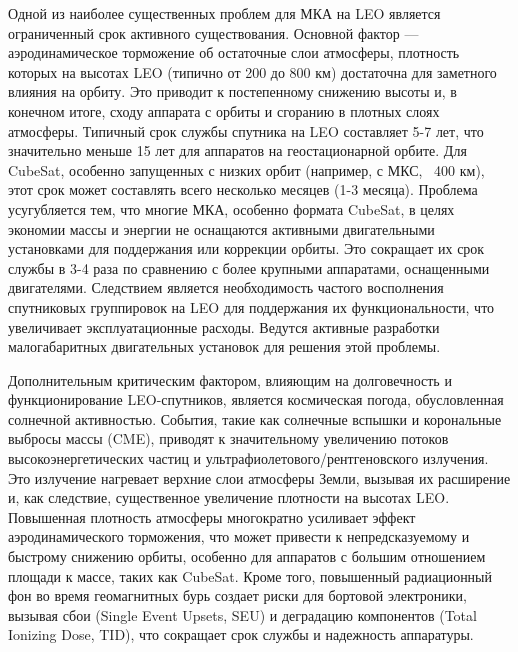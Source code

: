 Одной из наиболее существенных проблем для МКА на LEO является ограниченный срок активного существования. Основной фактор — аэродинамическое торможение об остаточные слои атмосферы, плотность которых на высотах LEO (типично от 200 до 800 км) достаточна для заметного влияния на орбиту\cite{leo_lifespan_smith_2021}. Это приводит к постепенному снижению высоты и, в конечном итоге, сходу аппарата с орбиты и сгоранию в плотных слоях атмосферы. Типичный срок службы спутника на LEO составляет 5-7 лет, что значительно меньше 15 лет для аппаратов на геостационарной орбите\cite{leo_lifespan_smith_2021}. Для CubeSat, особенно запущенных с низких орбит (например, с МКС, ~400 км), этот срок может составлять всего несколько месяцев (1-3 месяца)\cite{cubesat_low_orbit_nasa_2020}. Проблема усугубляется тем, что многие МКА, особенно формата CubeSat, в целях экономии массы и энергии не оснащаются активными двигательными установками для поддержания или коррекции орбиты\cite{cubesat_standard_2014}. Это сокращает их срок службы в 3-4 раза по сравнению с более крупными аппаратами, оснащенными двигателями\cite{cubesat_standard_2014}. Следствием является необходимость частого восполнения спутниковых группировок на LEO для поддержания их функциональности, что увеличивает эксплуатационные расходы\cite{leo_lifespan_smith_2021}. Ведутся активные разработки малогабаритных двигательных установок для решения этой проблемы\cite{cubesat_standard_2014}.

Дополнительным критическим фактором, влияющим на долговечность и функционирование LEO-спутников, является космическая погода, обусловленная солнечной активностью. События, такие как солнечные вспышки и корональные выбросы массы (CME), приводят к значительному увеличению потоков высокоэнергетических частиц и ультрафиолетового/рентгеновского излучения\cite{space_weather_effects_2019}. Это излучение нагревает верхние слои атмосферы Земли, вызывая их расширение и, как следствие, существенное увеличение плотности на высотах LEO\cite{atm_density_solar_activity_2021}. Повышенная плотность атмосферы многократно усиливает эффект аэродинамического торможения, что может привести к непредсказуемому и быстрому снижению орбиты, особенно для аппаратов с большим отношением площади к массе, таких как CubeSat\cite{solar_impact_leo_drag_2020}. Кроме того, повышенный радиационный фон во время геомагнитных бурь создает риски для бортовой электроники, вызывая сбои (Single Event Upsets, SEU) и деградацию компонентов (Total Ionizing Dose, TID), что сокращает срок службы и надежность аппаратуры\cite{space_weather_electronics_2018}.

